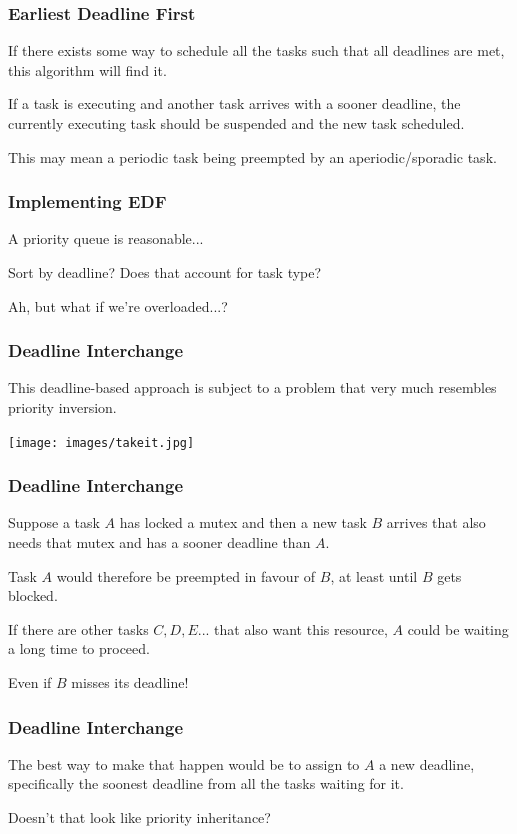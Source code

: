 \begin{frame}
\frametitle{Earliest Deadline First}

If there exists some way to schedule all the tasks such that all deadlines are met, this algorithm will find it. 

If a task is executing and another task arrives with a sooner deadline, the currently executing task should be suspended and the new task scheduled. 

This may mean a periodic task being preempted by an aperiodic/sporadic task.

\end{frame}

\begin{frame}
\frametitle{Implementing EDF}

A priority queue is reasonable...

Sort by deadline? Does that account for task type?

Ah, but what if we're overloaded...?

\end{frame}

\begin{frame}
\frametitle{Deadline Interchange}

This deadline-based approach is subject to a problem that very much resembles priority inversion.

\begin{center}
	\texttt{[image: images/takeit.jpg]}
\end{center}

\end{frame}

\begin{frame}
\frametitle{Deadline Interchange}
Suppose a task $A$ has locked a mutex and then a new task $B$ arrives that also needs that mutex and has a sooner deadline than $A$. 

Task $A$ would therefore be preempted in favour of $B$, at least until $B$ gets blocked. 

If there are other tasks $C, D, E$... that also want this resource, $A$ could be waiting a long time to proceed.

Even if $B$ misses its deadline!

\end{frame}

\begin{frame}
\frametitle{Deadline Interchange}

The best way to make that happen would be to assign to $A$ a new deadline, specifically the soonest deadline from all the tasks waiting for it. 

Doesn't that look like priority inheritance?

\end{frame}


